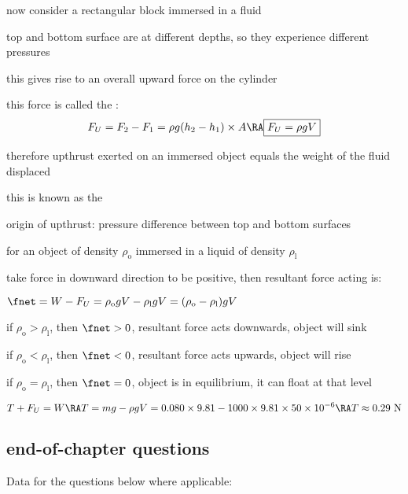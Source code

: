 now consider a rectangular block immersed in a fluid

top and bottom surface are at different depths, so they experience different pressures

this gives rise to an overall upward force on the cylinder

this force is called the : 
$$ F_U = F_2 - F_1 = \rho g (h_2 - h_1) \times A \RA \boxed{F_U = \rho g V} $$

therefore upthrust exerted on an immersed object equals the weight of the fluid displaced

this is known as the  

\cmt origin of upthrust: pressure difference between top and bottom surfaces

\cmt for an object of density $\rho_\text{o}$ immersed in a liquid of density $\rho_\text{l}$

take force in downward direction to be positive, then resultant force acting is:

{
	\centering
	
	$ \fnet = W - F_U = \rho_\text{o} g V - \rho_\text{l} g V = (\rho_\text{o} - \rho_\text{l}) gV$
	
}

\titem if $\rho_\text{o} > \rho_\text{l}$, then $\fnet>0$, resultant force acts downwards, object will sink

\titem if $\rho_\text{o} < \rho_\text{l}$, then $\fnet<0$, resultant force acts upwards, object will rise

\titem if $\rho_\text{o} = \rho_\text{l}$, then $\fnet=0$, object is in equilibrium, it can float at that level


\solc\begin{equation*}
	T + F_U = W \RA T = mg - \rho g V = 0.080 \times 9.81 - 1000 \times 9.81 \times 50 \times 10^{-6} \RA T \approx 0.29 \text{ N} 
\end{equation*}

\subsection{end-of-chapter questions}

Data for the questions below where applicable:

